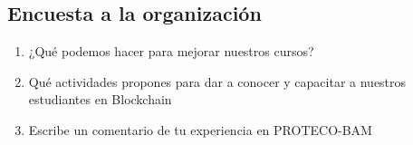 \documentclass[a4paper,12pt]{lib/pub}
\begin{document}
\subsection{Encuesta a la organización}
\begin{enumerate}
	\item ¿Qué podemos hacer para mejorar nuestros cursos?
	\item Qué actividades propones para dar a conocer y capacitar a nuestros estudiantes en Blockchain
	\item Escribe un comentario de tu experiencia en PROTECO-BAM
\end{enumerate}
\end{document}
